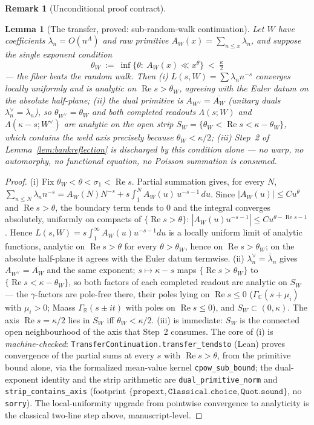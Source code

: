 \documentclass[11pt]{article}
\newtheorem{lemma}[theorem]{Lemma}
\theoremstyle{definition}
\newtheorem{remark}[theorem]{Remark}
\renewcommand{\Re}{\operatorname{Re}}
\begin{document}
\begin{remark}[Unconditional proof contract]
\begin{enumerate}
\begin{lemma}[The transfer, proved: sub-random-walk continuation]\label{lem:transfer}
Let $W$ have coefficients $\lambda_n=O(n^{A})$ and raw primitive $A_W(x)=\sum_{n\le x}\lambda_n$, and suppose
the single exponent condition
\[
  \theta_W\ :=\ \inf\{\theta:\ A_W(x)\ll x^{\theta}\}\ <\ \tfrac\kappa2
\]
--- \emph{the fiber beats the random walk}. Then \textup{(i)} $L(s,W)=\sum\lambda_n n^{-s}$ converges locally
uniformly and is analytic on $\Re s>\theta_W$, agreeing with the Euler datum on the absolute half-plane;
\textup{(ii)} the dual primitive is $A_{W^\vee}=\overline{A_W}$ (unitary duals $\lambda^\vee_n=
\bar\lambda_n$), so $\theta_{W^\vee}=\theta_W$ and \emph{both} completed readouts $\Lambda(s;W)$ and
$\Lambda(\kappa-s;W^\vee)$ are analytic on the open strip
$S_W=\{\theta_W<\Re s<\kappa-\theta_W\}$, which contains the weld axis precisely because
$\theta_W<\kappa/2$; \textup{(iii)} Step~2 of Lemma~\ref{lem:bankreflection} is discharged by this condition
alone --- no warp, no automorphy, no functional equation, no Poisson summation is consumed.
\end{lemma}
\begin{proof}
\textup{(i)} Fix $\theta_W<\theta<\sigma_1<\Re s$. Partial summation gives, for every $N$,
$\sum_{n\le N}\lambda_n n^{-s}=A_W(N)N^{-s}+s\int_1^{N}A_W(u)\,u^{-s-1}\,du$. Since $|A_W(u)|\le C u^{\theta}$
and $\Re s>\theta$, the boundary term tends to $0$ and the integral converges absolutely, uniformly on
compacts of $\{\Re s>\theta\}$: $|A_W(u)u^{-s-1}|\le C u^{\theta-\Re s-1}$. Hence
$L(s,W)=s\int_1^\infty A_W(u)u^{-s-1}du$ is a locally uniform limit of analytic functions, analytic on
$\Re s>\theta$ for every $\theta>\theta_W$, hence on $\Re s>\theta_W$; on the absolute half-plane it agrees
with the Euler datum termwise. \textup{(ii)} $\lambda^\vee_n=\bar\lambda_n$ gives $A_{W^\vee}=\overline{A_W}$
and the same exponent; $s\mapsto\kappa-s$ maps $\{\Re s>\theta_W\}$ to $\{\Re s<\kappa-\theta_W\}$, so both
factors of each completed readout are analytic on $S_W$ --- the $\gamma$-factors are pole-free there, their
poles lying on $\Re s\le0$ ($\Gamma_{\mathbb C}(s+\mu_i)$ with $\mu_i>0$; Maass $\Gamma_{\mathbb R}(s\pm it)$
with poles on $\Re s\le 0$), and $S_W\subset(0,\kappa)$. The axis $\Re s=\kappa/2$ lies in $S_W$ iff
$\theta_W<\kappa/2$. \textup{(iii)} is immediate: $S_W$ is the connected open neighbourhood of the axis that
Step~2 consumes.
The core of \textup{(i)} is \emph{machine-checked}: \texttt{TransferContinuation.transfer\_tendsto}
(Lean) proves convergence of the partial sums at every $s$ with $\Re s>\theta$, from the primitive
bound alone, via the formalized mean-value kernel \texttt{cpow\_sub\_bound}; the dual-exponent
identity and the strip arithmetic are \texttt{dual\_primitive\_norm} and
\texttt{strip\_contains\_axis} (footprint
$\{\texttt{propext},\texttt{Classical.choice},\texttt{Quot.sound}\}$, no \texttt{sorry}). The
local-uniformity upgrade from pointwise convergence to analyticity is the classical two-line step
above, manuscript-level.
\end{proof}


\end{enumerate}
\end{remark}
\end{document}
